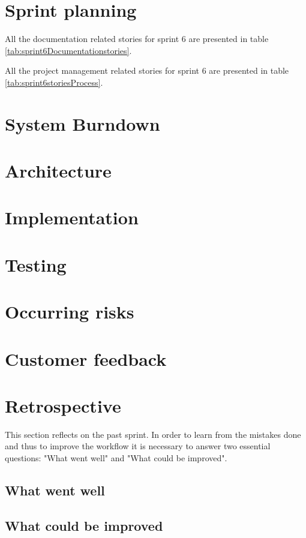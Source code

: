 \section{Sprint planning}

All the documentation related stories for sprint 6 are presented in table \ref{tab:sprint6Documentationstories}.


All the project management related stories for sprint 6 are presented in table \ref{tab:sprint6storiesProcess}.

\section{System Burndown}
\section{Architecture}
\section{Implementation}
\section{Testing}
\section{Occurring risks}
\section{Customer feedback}
\section{Retrospective}
This section reflects on the past sprint. In order to learn from the mistakes done and thus to improve the workflow it is necessary to answer two essential questions: "What went well" and "What could be improved".

\subsection{What went well}
\subsection{What could be improved}
